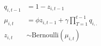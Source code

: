 \documentclass[10pt]{article}
\begin{document}
\begin{align*} 
q_{i, t-1} &= 1 - z_{i, t-1}\\
\mu_{i, t} &= \phi z_{i, t-1} + \gamma \prod_{T=1}^{t-1} q_{i,.}\\ 
z_{i, t} &\sim \textrm{Bernoulli}(\mu_{i, t})\\
\end{align*}
\end{document}
